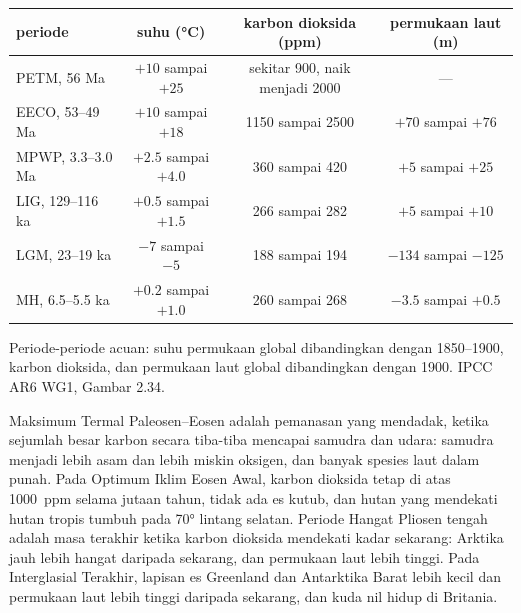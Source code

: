 \begin{center}
\small
\begin{tabular}{|l|c|c|c|}
\hline
\textbf{periode} & \textbf{suhu (\unit{\degreeCelsius})} & \textbf{karbon dioksida (ppm)} & \textbf{permukaan laut (m)} \\
\hline
PETM, 56 Ma & $+10$ sampai $+25$ & sekitar 900, naik menjadi 2000 & --- \\
EECO, 53--49 Ma & $+10$ sampai $+18$ & 1150 sampai 2500 & $+70$ sampai $+76$ \\
MPWP, 3.3--3.0 Ma & $+2.5$ sampai $+4.0$ & 360 sampai 420 & $+5$ sampai $+25$ \\
LIG, 129--116 ka & $+0.5$ sampai $+1.5$ & 266 sampai 282 & $+5$ sampai $+10$ \\
\textcolor{omCold}{LGM, 23--19 ka} & \textcolor{omCold}{$-7$ sampai $-5$} & \textcolor{omCold}{188 sampai 194} & \textcolor{omCold}{$-134$ sampai $-125$} \\
MH, 6.5--5.5 ka & $+0.2$ sampai $+1.0$ & 260 sampai 268 & $-3.5$ sampai $+0.5$ \\
\hline
\end{tabular}

\medskip
{\small Periode-periode acuan: suhu permukaan global dibandingkan dengan
1850--1900, karbon dioksida, dan permukaan laut global dibandingkan dengan 1900.
IPCC AR6 WG1, Gambar 2.34.}
\end{center}

Maksimum Termal Paleosen--Eosen adalah pemanasan yang mendadak, ketika
sejumlah besar karbon secara tiba-tiba mencapai samudra dan udara: samudra
menjadi lebih asam dan lebih miskin oksigen, dan banyak spesies laut dalam
punah. Pada Optimum Iklim Eosen Awal, karbon dioksida tetap di atas
\qty{1000}{ppm} selama jutaan tahun, tidak ada es kutub, dan hutan yang
mendekati hutan tropis tumbuh pada \ang{70} lintang selatan. Periode Hangat
Pliosen tengah adalah masa terakhir ketika karbon dioksida mendekati kadar
sekarang: Arktika jauh lebih hangat daripada sekarang, dan permukaan laut lebih
tinggi. Pada Interglasial Terakhir, lapisan es Greenland dan Antarktika Barat
lebih kecil dan permukaan laut lebih tinggi daripada sekarang, dan kuda nil
hidup di Britania.


